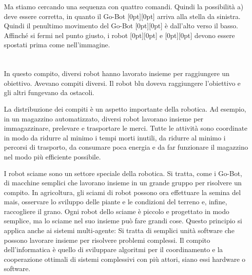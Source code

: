 {{Ma stiamo cercando una sequenza con quattro comandi. Quindi la possibilità a) deve essere corretta, in quanto il Go-Bot \raisebox{-0.5ex}[0pt][0pt]{} arriva alla stella da sinistra. Quindi il penultimo movimento del Go-Bot \raisebox{-0.5ex}[0pt][0pt]{} è dall’alto verso il basso. Affinché si fermi nel punto giusto, i robot \raisebox{-0.5ex}[0pt][0pt]{} e \raisebox{-0.5ex}[0pt][0pt]{} devono essere spostati prima come nell’immagine.



\section*{\BrochureItsInformatics}
In questo compito, diversi robot hanno lavorato insieme per raggiungere un obiettivo. Avevano compiti diversi. Il robot blu doveva raggiungere l’obiettivo e gli altri fungevano da ostacoli.

La distribuzione dei compiti è un aspetto importante della robotica. Ad esempio, in un magazzino automatizzato, diversi robot lavorano insieme per immagazzinare, prelevare e trasportare le merci. Tutte le attività sono coordinate in modo da ridurre al minimo i tempi morti inutili, da ridurre al minimo i percorsi di trasporto, da consumare poca energia e da far funzionare il magazzino nel modo più efficiente possibile.

I robot sciame sono un settore speciale della robotica. Si tratta, come i Go-Bot, di macchine semplici che lavorano insieme in un grande gruppo per risolvere un compito. In agricoltura, gli sciami di robot possono ora effettuare la semina del mais, osservare lo sviluppo delle piante e le condizioni del terreno e, infine, raccogliere il grano. Ogni robot dello sciame è piccolo e progettato in modo semplice, ma lo sciame nel suo insieme può fare grandi cose. Questo principio si applica anche ai sistemi multi-agente: Si tratta di semplici unità software che possono lavorare insieme per risolvere problemi complessi. Il compito dell’informatica è quello di sviluppare algoritmi per il coordinamento e la cooperazione ottimali di sistemi complessivi con più attori, siano essi hardware o software.



}}
